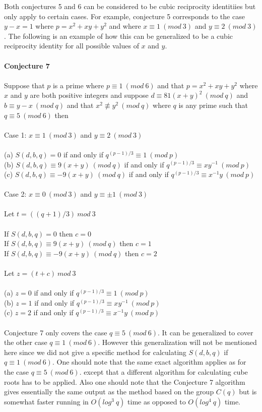 \documentclass[final,letterpaper,oneside,10pt]{article}
\begin{document}
Both conjectures 5 and 6 can be considered to be cubic reciprocity identitiies but only apply to certain cases.  For example, conjecture 5 corresponds to the case $y-x = 1$ where $p = x^{2}+xy+y^{2}$ and where $x \equiv 1~(mod~3)$ and $y \equiv 2~(mod~3)$.  The following is an example of how this can be generalized to be a cubic reciprocity identity for all possible values of $x$ and $y$.
\\
\\
\textbf{Conjecture 7}
\\
\\
Suppose that $p$ is a prime where $p \equiv 1~(mod~6)$ and that $p = x^{2}+xy+y^{2}$ where $x$ and $y$ are both positive integers and suppose $d \equiv 81(x+y)^{2} ~(mod~q)$ and $b \equiv y-x ~(mod~q)$ and that $x^{2} \not\equiv y^{2}~ (mod~q)$ where $q$ is any prime such that $q \equiv 5~(mod~6)$ then
\\
\\  Case 1: $x \equiv 1~(mod~3)$ and $ y \equiv 2~(mod~3)$
\\
\\
(a) $S(d,b,q) = 0$ if and only if $q^{(p-1)/3} \equiv 1~(mod~p)$
\\
(b) $S(d,b,q) \equiv 9(x+y)~(mod~q)$  if and only if $q^{(p-1)/3} \equiv xy^{-1}~(mod~p)$
\\
(c) $S(d,b,q) \equiv -9(x+y)~(mod~q)$  if and only if $q^{(p-1)/3} \equiv x^{-1}y~(mod~p)$
\\
\\ Case 2: $x \equiv 0~(mod~3)$ and $ y \equiv \pm 1~(mod~3)$
\\
\\
Let $t = ((q+1)/3) ~mod~3$
\\
\\
If $S(d,b,q) = 0$ then $c=0$
\\
If $S(d,b,q) \equiv 9(x+y)~(mod~q)$ then $c=1$
\\
If $S(d,b,q) \equiv -9(x+y)~(mod~q)$ then $c=2$   
\\
\\
Let $z = (t+c)~mod~3$
\\
\\
(a) $z = 0$ if and only if $q^{(p-1)/3} \equiv 1~(mod~p)$
\\
(b) $z = 1$  if and only if $q^{(p-1)/3} \equiv xy^{-1}~(mod~p)$
\\
(c) $z = 2$  if and only if $q^{(p-1)/3} \equiv x^{-1}y~(mod~p)$
\\
\\
Conjecture 7 only covers the case $q \equiv 5~(mod~6)$.  It can be generalized to cover the other case $q \equiv 1~(mod~6)$.  However this generalization will not be mentioned here since we did not give a specific method for calculating $S(d,b,q)$ if  $q \equiv 1~(mod~6)$. One should note that the same exact algorithm applies as for the case  $q \equiv 5~(mod~6)$. except that a different algorithm for calculating cube roots has to be applied.  Also one should note that the Conjecture 7 algorithm gives essentially the same output as the method based on the group $C(q)$ but is somewhat faster running in $O(log^{3}~ q)$ time as opposed to $O(log^{4}~q)$ time.
\end{document}

